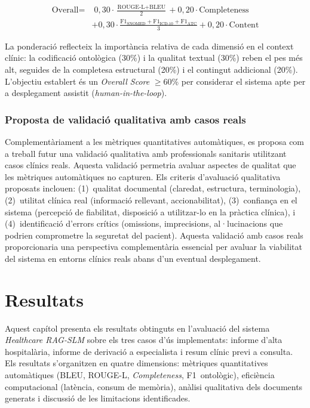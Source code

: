 \documentclass[CAT]{TFUOC}%
\begin{document}
\begin{equation*}
\begin{split}
\text{Overall} = & \; 0{,}30 \cdot \frac{\text{ROUGE-L}+\text{BLEU}}{2} + 0{,}20 \cdot \text{Completeness} \\
& + 0{,}30 \cdot \frac{\text{F1}_\text{SNOMED}+\text{F1}_\text{ICD-10}+\text{F1}_\text{ATC}}{3} + 0{,}20 \cdot \text{Content}
\end{split}
\end{equation*}

La ponderació reflecteix la importància relativa de cada dimensió en el context clínic: la codificació ontològica (30\%) i la qualitat textual (30\%) reben el pes més alt, seguides de la completesa estructural (20\%) i el contingut addicional (20\%). L'objectiu establert és un \textit{Overall Score} $\geq$60\% per considerar el sistema apte per a desplegament assistit (\textit{human-in-the-loop}).

\subsection{Proposta de validació qualitativa amb casos reals}

Complementàriament a les mètriques quantitatives automàtiques, es proposa com a treball futur una validació qualitativa amb professionals sanitaris utilitzant casos clínics reals. Aquesta validació permetria avaluar aspectes de qualitat que les mètriques automàtiques no capturen. Els criteris d'avaluació qualitativa proposats inclouen: (1)~qualitat documental (claredat, estructura, terminologia), (2)~utilitat clínica real (informació rellevant, accionabilitat), (3)~confiança en el sistema (percepció de fiabilitat, disposició a utilitzar-lo en la pràctica clínica), i (4)~identificació d'errors crítics (omissions, imprecisions, al·lucinacions que podrien comprometre la seguretat del pacient). Aquesta validació amb casos reals proporcionaria una perspectiva complementària essencial per avaluar la viabilitat del sistema en entorns clínics reals abans d'un eventual desplegament.

\chapter{Resultats}

Aquest capítol presenta els resultats obtinguts en l'avaluació del sistema \textit{Healthcare RAG-SLM} sobre els tres casos d'ús implementats: informe d'alta hospitalària, informe de derivació a especialista i resum clínic previ a consulta. Els resultats s'organitzen en quatre dimensions: mètriques quantitatives automàtiques (BLEU, ROUGE-L, \textit{Completeness}, F1~ontològic), eficiència computacional (latència, consum de memòria), anàlisi qualitativa dels documents generats i discussió de les limitacions identificades.
\end{document}

